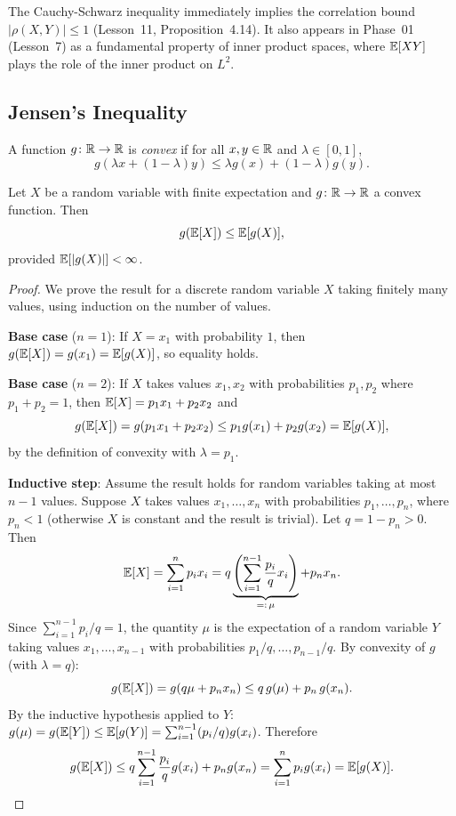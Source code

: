 \documentclass[11pt,a4paper]{article}
\begin{document}
\begin{remark}
\label{rem:cs_correlation}
The Cauchy-Schwarz inequality immediately implies the correlation
bound $|\rho(X,Y)| \leq 1$ (Lesson~11, Proposition~4.14). It also
appears in Phase~01 (Lesson~7) as a fundamental property of inner
product spaces, where $\mathbb{E}[XY]$ plays the role of the inner product
on $L^2$.
\end{remark}

\subsection{Jensen's Inequality}

\begin{definition}
\label{def:convex}
A function $g \colon \mathbb{R} \to \mathbb{R}$ is \emph{convex} if for all
$x, y \in \mathbb{R}$ and $\lambda \in [0, 1]$,
\[
    g(\lambda x + (1 - \lambda) y) \leq \lambda g(x)
    + (1 - \lambda) g(y).
\]
\end{definition}

\begin{theorem}
\label{thm:jensen}
Let $X$ be a random variable with finite expectation and
$g \colon \mathbb{R} \to \mathbb{R}$ a convex function. Then
\[
    g(\mathbb{E}[X]) \leq \mathbb{E}[g(X)],
\]
provided $\mathbb{E}[|g(X)|] < \infty$.
\end{theorem}

\begin{proof}
We prove the result for a discrete random variable $X$ taking
finitely many values, using induction on the number of values.

\textbf{Base case} ($n = 1$): If $X = x_1$ with probability $1$,
then $g(\mathbb{E}[X]) = g(x_1) = \mathbb{E}[g(X)]$, so equality holds.

\textbf{Base case} ($n = 2$): If $X$ takes values $x_1, x_2$ with
probabilities $p_1, p_2$ where $p_1 + p_2 = 1$, then
$\mathbb{E}[X] = p_1 x_1 + p_2 x_2$ and
\[
    g(\mathbb{E}[X]) = g(p_1 x_1 + p_2 x_2)
    \leq p_1 g(x_1) + p_2 g(x_2) = \mathbb{E}[g(X)],
\]
by the definition of convexity with $\lambda = p_1$.

\textbf{Inductive step}: Assume the result holds for random variables
taking at most $n - 1$ values. Suppose $X$ takes values
$x_1, \ldots, x_n$ with probabilities $p_1, \ldots, p_n$, where
$p_n < 1$ (otherwise $X$ is constant and the result is trivial).
Let $q = 1 - p_n > 0$. Then
\[
    \mathbb{E}[X] = \sum_{i=1}^n p_i x_i
    = q \underbrace{\left(\sum_{i=1}^{n-1} \frac{p_i}{q} x_i\right)}_{=: \,\mu}
    + p_n x_n.
\]
Since $\sum_{i=1}^{n-1} p_i/q = 1$, the quantity $\mu$ is the
expectation of a random variable $Y$ taking values
$x_1, \ldots, x_{n-1}$ with probabilities $p_1/q, \ldots, p_{n-1}/q$.
By convexity of $g$ (with $\lambda = q$):
\[
    g(\mathbb{E}[X]) = g(q\mu + p_n x_n)
    \leq q \, g(\mu) + p_n \, g(x_n).
\]
By the inductive hypothesis applied to $Y$:
$g(\mu) = g(\mathbb{E}[Y]) \leq \mathbb{E}[g(Y)]
= \sum_{i=1}^{n-1} (p_i/q) g(x_i)$.
Therefore
\[
    g(\mathbb{E}[X]) \leq q \sum_{i=1}^{n-1} \frac{p_i}{q} g(x_i)
    + p_n g(x_n)
    = \sum_{i=1}^n p_i g(x_i) = \mathbb{E}[g(X)]. \qedhere
\]
\end{proof}
\end{document}

